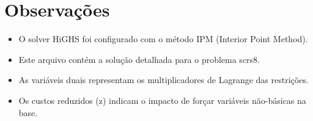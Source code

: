 \documentclass[12pt]{article}
\begin{document}
\section{Observações}

\begin{itemize}
\item O solver HiGHS foi configurado com o método IPM (Interior Point Method).
\item Este arquivo contém a solução detalhada para o problema scrs8.
\item As variáveis duais representam os multiplicadores de Lagrange das restrições.
\item Os custos reduzidos (z) indicam o impacto de forçar variáveis não-básicas na base.
\end{itemize}
\end{document}
